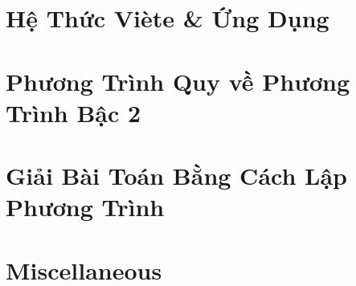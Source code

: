 \documentclass{article}
\begin{document}

\section{Hệ Thức Vi\`ete \& Ứng Dụng}


\section{Phương Trình Quy về Phương Trình Bậc 2}


\section{Giải Bài Toán Bằng Cách Lập Phương Trình}


\section{Miscellaneous}


\printbibliography[heading=bibintoc]
	
\end{document}
